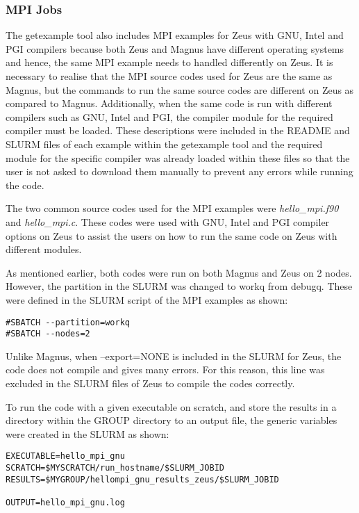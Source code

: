 \subsubsection{MPI Jobs}

The getexample tool also includes MPI examples for Zeus with GNU, Intel and PGI compilers because both Zeus and Magnus have different operating systems 
and hence, the same MPI example needs to handled differently on Zeus. It is necessary to realise that the MPI source codes used for Zeus are the same
as Magnus, but the commands to run the same source codes are different on Zeus as compared to Magnus. Additionally, when the same code is run 
with different compilers such as GNU, Intel and PGI, the compiler module for the required compiler must be loaded. These descriptions were included in
the README and SLURM files of each example within the getexample tool and the required module for the specific compiler was already loaded within these 
files so that the user is not asked to download them manually to prevent any errors while running the code.

The two common source codes used for the MPI examples were \emph{hello\_mpi.f90} and \emph{hello\_mpi.c}. These codes were used with GNU, Intel and PGI 
compiler options on Zeus to assist the users on how to run the same code on Zeus with different modules.

As mentioned earlier, both codes were run on both Magnus and Zeus on 2 nodes. However, the partition in the SLURM was changed to workq from debugq.
These were defined in the SLURM script of the MPI examples as shown: 

\begin{tcolorbox}
\begin{Verbatim}[fontsize=\scriptsize]
#SBATCH --partition=workq
#SBATCH --nodes=2
\end{Verbatim}
\end{tcolorbox}

Unlike Magnus, when --export=NONE is included in the SLURM for Zeus, the code does not compile and gives many errors. For this reason, this line was
excluded in the SLURM files of Zeus to compile the codes correctly.

To run the code with a given executable on scratch, and store the results in a directory within the GROUP directory to an output file, the generic 
variables were created in the SLURM as shown:

\begin{tcolorbox}
\begin{Verbatim}[fontsize=\scriptsize]
EXECUTABLE=hello_mpi_gnu
SCRATCH=$MYSCRATCH/run_hostname/$SLURM_JOBID
RESULTS=$MYGROUP/hellompi_gnu_results_zeus/$SLURM_JOBID

OUTPUT=hello_mpi_gnu.log
\end{Verbatim}
\end{tcolorbox}

